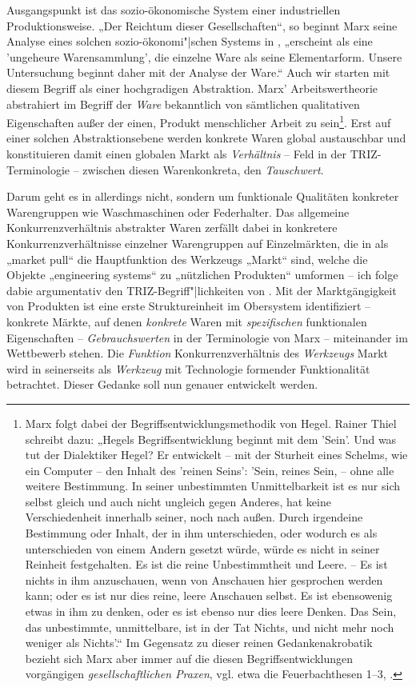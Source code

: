 \documentclass[11pt,a4paper]{article}
\begin{document}
Ausgangspunkt ist das sozio-ökonomische System einer industriellen
Produktionsweise. „Der Reichtum dieser Gesellschaften“, so beginnt Marx seine
Analyse eines solchen sozio-ökonomi"|schen Systems in \cite{MEW23}, „erscheint
als eine 'ungeheure Warensammlung', die einzelne Ware als seine
Elementarform. Unsere Untersuchung beginnt daher mit der Analyse der Ware.“
Auch wir starten mit diesem Begriff als einer hochgradigen Abstraktion.  Marx'
Arbeitswertheorie abstrahiert im Begriff der \emph{Ware} bekanntlich von
sämtlichen qualitativen Eigenschaften außer der einen, Produkt menschlicher
Arbeit zu sein\footnote{Marx folgt dabei der Begriffsentwicklungsmethodik von
  Hegel. Rainer Thiel \cite[S. 190]{Thiel2007} schreibt dazu: „Hegels
  Begriffsentwicklung beginnt mit dem 'Sein'. Und was tut der Dialektiker
  Hegel? Er entwickelt – mit der Sturheit eines Schelms, wie ein Computer –
  den Inhalt des 'reinen Seins': 'Sein, reines Sein, -- ohne alle weitere
  Bestimmung. In seiner unbestimmten Unmittelbarkeit ist es nur sich selbst
  gleich und auch nicht ungleich gegen Anderes, hat keine Verschiedenheit
  innerhalb seiner, noch nach außen. Durch irgendeine Bestimmung oder Inhalt,
  der in ihm unterschieden, oder wodurch es als unterschieden von einem Andern
  gesetzt würde, würde es nicht in seiner Reinheit festgehalten. Es ist die
  reine Unbestimmtheit und Leere. – Es ist nichts in ihm anzuschauen, wenn von
  Anschauen hier gesprochen werden kann; oder es ist nur dies reine, leere
  Anschauen selbst. Es ist ebensowenig etwas in ihm zu denken, oder es ist
  ebenso nur dies leere Denken. Das Sein, das unbestimmte, unmittelbare, ist
  in der Tat Nichts, und nicht mehr noch weniger als Nichts'.“ Im Gegensatz zu
  dieser reinen Gedankenakrobatik bezieht sich Marx aber immer auf die diesen
  Begriffsentwicklungen vorgängigen \emph{gesellschaftlichen Praxen},
  vgl. etwa die Feuerbachthesen 1--3, \cite{MEW3}.}.  Erst auf einer solchen
Abstraktionsebene werden konkrete Waren global austauschbar und konstituieren
damit einen globalen Markt als \emph{Verhältnis} -- Feld in der
TRIZ-Terminologie -- zwischen diesen Warenkonkreta, den \emph{Tauschwert}.

Darum geht es in \cite{TESE2018} allerdings nicht, sondern um funktionale
Qualitäten konkreter Warengruppen wie Waschmaschinen oder Federhalter. Das
allgemeine Konkurrenzverhältnis abstrakter Waren zerfällt dabei in konkretere
Konkurrenzverhältnisse einzelner Warengruppen auf Einzelmärkten, die in
\cite{TESE2018} als „market pull“ die Hauptfunktion des Werkzeugs „Markt“
sind, welche die Objekte „engineering systems“ zu „nützlichen Produkten“
umformen -- ich folge dabie argumentativ den TRIZ-Begriff"|lichkeiten von
\cite{TT}.  Mit der Marktgängigkeit von Produkten ist eine erste
Struktureinheit im Obersystem identifiziert -- konkrete Märkte, auf denen
\emph{konkrete} Waren mit \emph{spezifischen} funktionalen Eigenschaften --
\emph{Gebrauchswerten} in der Terminologie von Marx -- miteinander im
Wettbewerb stehen.  Die \emph{Funktion} Konkurrenzverhältnis des
\emph{Werkzeugs} Markt wird in \cite{TESE2018} seinerseits als \emph{Werkzeug}
mit Technologie formender Funktionalität betrachtet.  Dieser Gedanke soll nun
genauer entwickelt werden.
\end{document}
